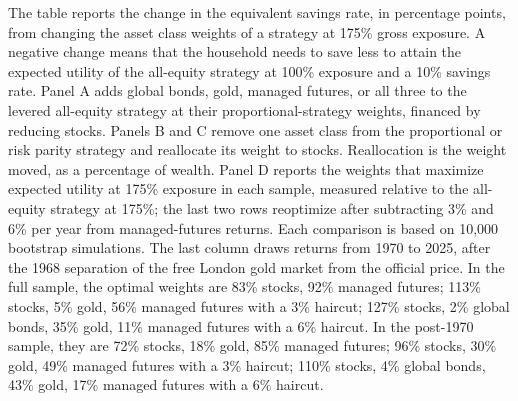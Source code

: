\begin{table}[p]\centering
\caption{Sources of the gains from levered diversification}\label{tab:composition-value}
\begin{minipage}{\linewidth}\small The table reports the change in the equivalent savings rate, in percentage points, from changing the asset class weights of a strategy at 175\% gross exposure. A negative change means that the household needs to save less to attain the expected utility of the all-equity strategy at 100\% exposure and a 10\% savings rate. Panel A adds global bonds, gold, managed futures, or all three to the levered all-equity strategy at their proportional-strategy weights, financed by reducing stocks. Panels B and C remove one asset class from the proportional or risk parity strategy and reallocate its weight to stocks. Reallocation is the weight moved, as a percentage of wealth. Panel D reports the weights that maximize expected utility at 175\% exposure in each sample, measured relative to the all-equity strategy at 175\%; the last two rows reoptimize after subtracting 3\% and 6\% per year from managed-futures returns. Each comparison is based on 10,000 bootstrap simulations. The last column draws returns from 1970 to 2025, after the 1968 separation of the free London gold market from the official price. In the full sample, the optimal weights are 83\% stocks, 92\% managed futures; 113\% stocks, 5\% gold, 56\% managed futures with a 3\% haircut; 127\% stocks, 2\% global bonds, 35\% gold, 11\% managed futures with a 6\% haircut. In the post-1970 sample, they are 72\% stocks, 18\% gold, 85\% managed futures; 96\% stocks, 30\% gold, 49\% managed futures with a 3\% haircut; 110\% stocks, 4\% global bonds, 43\% gold, 17\% managed futures with a 6\% haircut.\end{minipage}
\medskip


\end{table}

